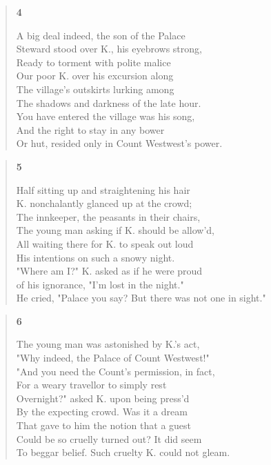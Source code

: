 \documentclass{article}
\begin{document}
\newpage
\begin{verse}
    \begin{center}
    \textbf{4} \\
  \end{center}
    A big deal indeed, the son of the Palace \\
    Steward stood over K., his eyebrows strong, \\
    Ready to torment with polite malice \\
    Our poor K. over his excursion along \\
    The village's outskirts lurking among \\
    The shadows and darkness of the late hour. \\
    You have entered the village was his song, \\
    And the right to stay in any bower \\
    Or hut, resided only in Count Westwest's power.
\end{verse}
\begin{verse}
  \begin{center}
    \textbf{5} \\
  \end{center}
  Half sitting up and straightening his hair \\
  K. nonchalantly glanced up at the crowd;  \\
  The innkeeper, the peasants in their chairs,  \\
  The young man asking if K. should be allow'd, \\
  All waiting there for K. to speak out loud \\
  His intentions on such a snowy night. \\
  "Where am I?" K. asked as if he were proud \\
  of his ignorance, "I'm lost in the night." \\
  He cried, "Palace you say? But there was not one in sight."
\end{verse}
\begin{verse}
  \begin{center}
    \textbf{6} \\
  \end{center}
  The young man was astonished by K.'s act, \\
  "Why indeed, the Palace of Count Westwest!" \\
  "And you need the Count's permission, in fact, \\
  For a weary travellor to simply rest \\
  Overnight?" asked K. upon being press'd \\
  By the expecting crowd. Was it a dream \\
  That gave to him the notion that a guest \\
  Could be so cruelly turned out? It did seem \\
  To beggar belief. Such cruelty K. could not gleam.
\end{verse}
\end{document}
